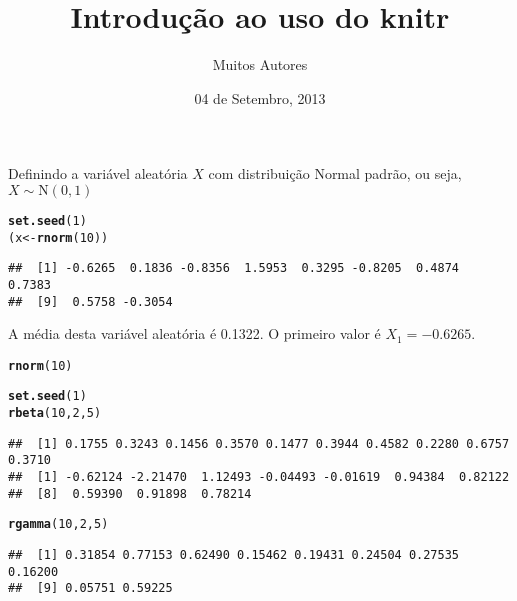 \documentclass{article}\usepackage[]{graphicx}\usepackage[]{color}
\title{Introdução ao uso do knitr}
\author{Muitos Autores}
\date{04 de Setembro, 2013}
\makeatletter
\newcommand{\hlnum}[1]{\textcolor[rgb]{0.686,0.059,0.569}{#1}}%
\newcommand{\hlstd}[1]{\textcolor[rgb]{0.345,0.345,0.345}{#1}}%
\newcommand{\hlkwb}[1]{\textcolor[rgb]{0.69,0.353,0.396}{#1}}%
\newcommand{\hlkwd}[1]{\textcolor[rgb]{0.737,0.353,0.396}{\textbf{#1}}}%
\newenvironment{kframe}{%
 \def\at@end@of@kframe{}%
 \ifinner\ifhmode%
  \def\at@end@of@kframe{\end{minipage}}%
  \begin{minipage}{\columnwidth}%
 \fi\fi%
 \def\FrameCommand##1{\hskip\@totalleftmargin \hskip-\fboxsep
 \colorbox{shadecolor}{##1}\hskip-\fboxsep
     \hskip-\linewidth \hskip-\@totalleftmargin \hskip\columnwidth}%
 \MakeFramed {\advance\hsize-\width
   \@totalleftmargin\z@ \linewidth\hsize
   \@setminipage}}%
 {\par\unskip\endMakeFramed%
 \at@end@of@kframe}
\newenvironment{knitrout}{}{} %
\makeatother
\begin{document}
\maketitle





Definindo a variável aleatória $X$ com distribuição Normal padrão, ou
seja, $X \sim \textrm{N}(0,1)$
\begin{knitrout}
\color{fgcolor}\begin{kframe}
\begin{alltt}
\hlkwd{set.seed}\hlstd{(}\hlnum{1}\hlstd{)}
\hlstd{(x} \hlkwb{<-} \hlkwd{rnorm}\hlstd{(}\hlnum{10}\hlstd{))}
\end{alltt}
\begin{verbatim}
##  [1] -0.6265  0.1836 -0.8356  1.5953  0.3295 -0.8205  0.4874  0.7383
##  [9]  0.5758 -0.3054
\end{verbatim}
\end{kframe}
\end{knitrout}

A média desta variável aleatória é 0.1322. O primeiro valor é
$X_1 = -0.6265$.

\begin{knitrout}
\color{fgcolor}\begin{kframe}
\begin{alltt}
\hlkwd{rnorm}\hlstd{(}\hlnum{10}\hlstd{)}
\end{alltt}
\end{kframe}
\end{knitrout}


\begin{knitrout}
\color{fgcolor}\begin{kframe}
\begin{alltt}
\hlkwd{set.seed}\hlstd{(}\hlnum{1}\hlstd{)}
\hlkwd{rbeta}\hlstd{(}\hlnum{10}\hlstd{,} \hlnum{2}\hlstd{,} \hlnum{5}\hlstd{)}
\end{alltt}
\begin{verbatim}
##  [1] 0.1755 0.3243 0.1456 0.3570 0.1477 0.3944 0.4582 0.2280 0.6757 0.3710
##  [1] -0.62124 -2.21470  1.12493 -0.04493 -0.01619  0.94384  0.82122
##  [8]  0.59390  0.91898  0.78214
\end{verbatim}
\begin{alltt}
\hlkwd{rgamma}\hlstd{(}\hlnum{10}\hlstd{,} \hlnum{2}\hlstd{,} \hlnum{5}\hlstd{)}
\end{alltt}
\begin{verbatim}
##  [1] 0.31854 0.77153 0.62490 0.15462 0.19431 0.24504 0.27535 0.16200
##  [9] 0.05751 0.59225
\end{verbatim}
\end{kframe}
\end{knitrout}
\end{document}
